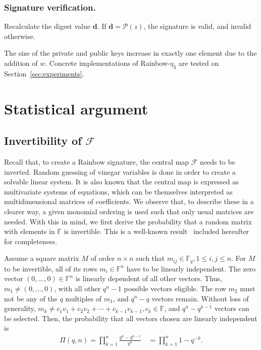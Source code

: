 \documentclass[draft, 12pt, a4paper, oneside]{memoir}
\theoremstyle{definition}
\begin{document}
\subsubsection{Signature verification.}

Recalculate the digest value $\mathbf{d}$. If $\mathbf{d} = \mathcal{P}(z)$,
the signature is valid, and invalid otherwise.

The size of the private and public keys increase in exactly one element due to
the addition of $w$. Concrete implementations of Rainbow-$\eta_{3}$ are tested on
Section~\ref{sec:experiments}.

\section{Statistical argument}

\subsection{Invertibility of $\mathcal{F}$}\label{subsec:invert}

Recall that, to create a Rainbow signature, the central map $\mathcal{F}$ needs
to be inverted. Random guessing of vinegar variables is done in order to create
a solvable linear system. It is also known that the central map is expressed as
multivariate systems of equations, which can be themselves interpreted as
multidimensional matrices of coefficients. We observe that, to describe these in a
clearer way, a given monomial ordering is used such that only usual matrices
are needed. With this in mind, we first derive the probability that a random
matrix with elements in $\mathbb{F}$ is invertible. This is a well-known
result~\cite[Remark 13.2.14]{Mullen:2013} included hereafter for completeness.

Assume a square matrix $M$ of order $n \times n$ such that
$m_{ij} \in \mathbb{F}_{q}, 1 \leq i, j \leq n$. For $M$ to be
invertible, all of its rows
$m_{i} \in \mathbb{F}^{n}$ have to be linearly independent. The zero vector
$(0, \dots, 0) \in \mathbb{F}^{n}$ is linearly dependent of all other vectors.
Thus, $m_{1} \neq (0, \dots, 0)$, with all other $q^{n} - 1$ possible vectors
eligible. The row $m_{2}$ must not be any of the $q$ multiples of $m_{1}$, and
$q^{n} - q$ vectors remain. Without loss of generality,
$m_{k} \ne c_{1} v_{1} + c_{2} v_{2} + \cdots + c_{k - 1} v_{k - 1},
c_{k} \in \mathbb{F}$, and $q^{n} - q^{k - 1}$ vectors can be selected. Then,
the probability that all vectors chosen are linearly independent is
\begin{align}
  \Pi(q, n) = \prod_{k = 1}^{n} \frac{q^{n} - q^{k - 1}}{q^{n}} \quad
    = \prod_{k = 1}^{n} 1 - q^{-k}.
\end{align}
\end{document}
